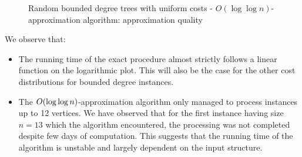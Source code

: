 \begin{figure}[ht]
\centering
{}
\caption{Random bounded degree trees with uniform costs - $O(\log \log n)$-approximation algorithm: approximation quality}
\label{fig:bounded_degree_c_uniform_kup}
\end{figure}
\FloatBarrier
We observe that:
\begin{itemize}
\item The running time of the exact procedure almost strictly follows a linear function on the logarithmic plot. This will also be the case for the other cost distributions for bounded degree instances.
\item The $O\mathopen{}\left( \log\log n \right)$-approximation algorithm only managed to process instances up to 12 vertices. We have observed that for the first instance having size $n=13$ which the algorithm encountered, the processing was not completed despite few days of computation. This suggests that the running time of the algorithm is unstable and largely dependent on the input structure.
\end{itemize}


